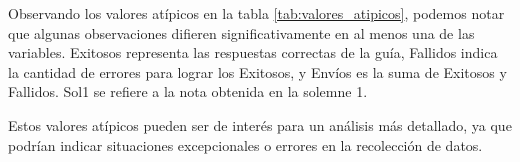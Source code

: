 Observando los valores atípicos en la tabla \ref{tab:valores_atipicos}, podemos notar que algunas
observaciones difieren significativamente en al menos una de las variables. Exitosos representa
las respuestas correctas de la guía, Fallidos indica la cantidad de errores para lograr los
Exitosos, y Envíos es la suma de Exitosos y Fallidos. Sol1 se refiere a la nota
obtenida en la solemne 1.

Estos valores atípicos pueden ser de interés para un análisis más detallado, ya que podrían
indicar situaciones excepcionales o errores en la recolección de datos.